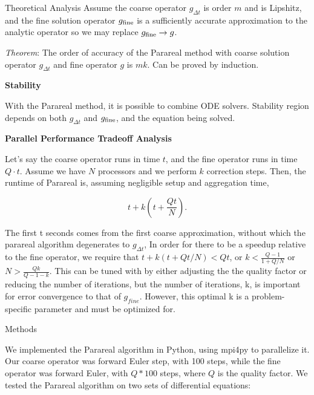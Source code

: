 \documentclass[final]{beamer}
\newlength{\onecolwid}
\begin{document}
\begin{frame}[t]
\begin{columns}[t]
\begin{column}{\onecolwid}
\begin{block}{Theoretical Analysis}
Assume the coarse operator $g_{\Delta t}$ is order $m$ and is Lipshitz, and the
fine solution operator $g_{\textnormal{fine}}$ is a sufficiently accurate
approximation to the analytic operator so we may replace $g_{\textnormal{fine}}
\to g$. 

\emph{Theorem}: The order of accuracy of the Parareal method with coarse
solution operator $g_{\Delta t}$ and fine operator $g$ is $mk$. Can be proved by
induction. 

\textbf{Stability}

With the Parareal method, it is possible to combine ODE solvers. Stability
region depends on both $g_{\Delta t}$ and $g_{\textnormal{fine}}$, and the
equation being solved. 

\textbf{Parallel Performance Tradeoff Analysis}

Let's say the coarse operator runs in time $t$, and the fine operator runs in
time $Q \cdot t$. Assume we have $N$ processors and we perform $k$ correction
steps. Then, the runtime of Parareal is, assuming negligible setup and
aggregation time,

\begin{equation}
t + k(t + \frac{Qt}{N}).
\end{equation}

The first t seconds comes from the first coarse approximation, without which the parareal algorithm degenerates to $g_{\Delta t}$,  In order for there to be a speedup relative to the fine operator, we require
that $t + k(t + Qt/N) < Qt$, or $k < \frac{Q - 1}{1 + Q/N}$ or $N > \frac{Qk}{Q
- 1 - k}$. This can be tuned with by either adjusting the the quality factor or reducing the number of iterations, but the number of iterations, k, is important for error convergence to that of $g_{fine}$.  However, this optimal k is a problem-specific parameter and must be optimized for.

\end{block}


\begin{block}{Methods}

We implemented the Parareal algorithm in Python, using mpi4py to parallelize it.
Our coarse operator was forward Euler step, with 100 steps, while the fine
operator was forward Euler, with $Q * 100$ steps, where $Q$ is the quality
factor. We tested the Parareal algorithm on two sets of differential equations:


\end{block}
\end{column}
\end{columns}
\end{frame}
\end{document}
